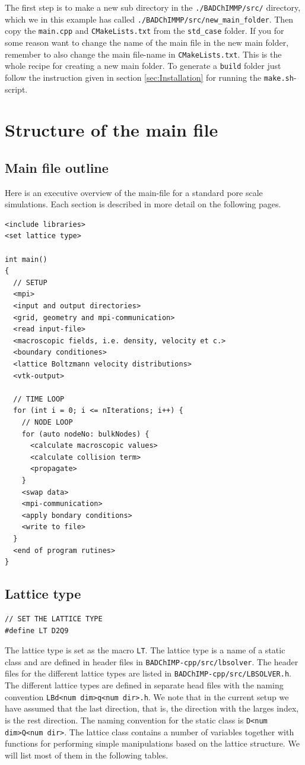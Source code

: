 \documentclass[11pt,a4paper]{report}
\begin{document}
The first step is to make a new sub directory in the \texttt{./BADChIMMP/src/} directory, which we in this example has called \texttt{./BADChIMMP/src/new{\_}main{\_}folder}. Then copy the \texttt{main.cpp} and \texttt{CMakeLists.txt} from the \texttt{std{\_}case} folder. If you for some reason want to change the name of the main file in the new main folder, remember to also change the main file-name in \texttt{CMakeLists.txt}. This is the whole recipe for creating a new main folder. To generate a \texttt{build} folder just follow the instruction given in section \ref{sec:Installation} for running the \texttt{make.sh}-script.

\section{Structure of the main file}
\subsection{Main file outline}
Here is an executive overview of the main-file for a standard pore scale simulations. Each section is described in more detail on the following pages.
\begin{verbatim}
<include libraries>
<set lattice type>

int main()
{
  // SETUP
  <mpi>
  <input and output directories>
  <grid, geometry and mpi-communication>
  <read input-file>
  <macroscopic fields, i.e. density, velocity et c.>
  <boundary conditiones>
  <lattice Boltzmann velocity distributions>
  <vtk-output>
  
  // TIME LOOP
  for (int i = 0; i <= nIterations; i++) {
  	// NODE LOOP
    for (auto nodeNo: bulkNodes) {
      <calculate macroscopic values>
      <calculate collision term>
      <propagate>
    }
    <swap data>
    <mpi-communication>
    <apply bondary conditions>
    <write to file>
  }
  <end of program rutines>
}

\end{verbatim}
\subsection{Lattice type}
\begin{verbatim}
// SET THE LATTICE TYPE
#define LT D2Q9
\end{verbatim}
The lattice type is set as the macro \texttt{LT}. The lattice type is a name of a static class and are defined in header files in \texttt{BADChIMP-cpp/src/lbsolver}. The header files for the different lattice types are listed in \texttt{BADChIMP-cpp/src/LBSOLVER.h}.
The different lattice types are defined in separate head files with the naming convention \texttt{LBd<num dim>q<num dir>.h}. We note that in the current setup we have assumed that the last direction, that is, the direction with the larges index, is the rest direction. The naming convention for the static class is \texttt{D<num dim>Q<num dir>}. The lattice class contains a number of variables together with functions for performing simple manipulations based on the lattice structure. We will list most of them in the following tables.
 
\end{document}
